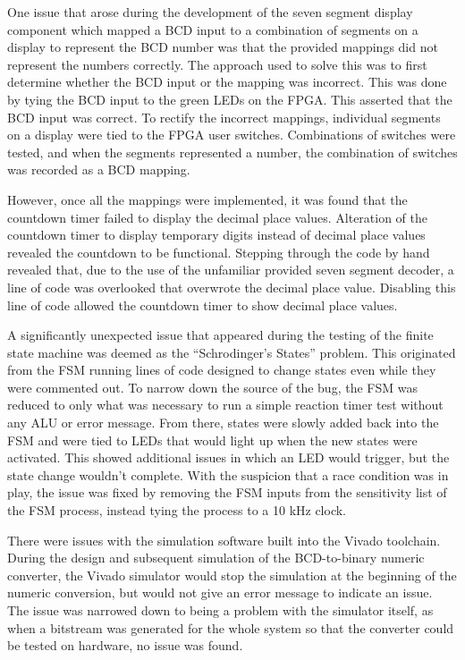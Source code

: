 \documentclass[11pt]{article}
\begin{document}
One issue that arose during the development of the seven segment display component which mapped a BCD input to a combination of segments on a display to represent the BCD number was that the provided mappings did not represent the numbers correctly. The approach used to solve this was to first determine whether the BCD input or the mapping was incorrect. This was done by tying the BCD input to the green LEDs on the FPGA. This asserted that the BCD input was correct. To rectify the incorrect mappings, individual segments on a display were tied to the FPGA user switches. Combinations of switches were tested, and when the segments represented a number, the combination of switches was recorded as a BCD mapping.

However, once all the mappings were implemented, it was found that the countdown timer failed to display the decimal place values. Alteration of the countdown timer to display temporary digits instead of decimal place values revealed the countdown to be functional. Stepping through the code by hand revealed that, due to the use of the unfamiliar provided seven segment decoder, a line of code was overlooked that overwrote the decimal place value. Disabling this line of code allowed the countdown timer to show decimal place values.

A significantly unexpected issue that appeared during the testing of the finite state machine was deemed as the ``Schrodinger's States'' problem. This originated from the FSM running lines of code designed to change states even while they were commented out. To narrow down the source of the bug, the FSM was reduced to only what was necessary to run a simple reaction timer test without any ALU or error message. From there, states were slowly added back into the FSM and were tied to LEDs that would light up when the new states were activated. This showed additional issues in which an LED would trigger, but the state change wouldn't complete. With the suspicion that a race condition was in play, the issue was fixed by removing the FSM inputs from the sensitivity list of the FSM process, instead tying the process to a 10 kHz clock.

There were issues with the simulation software built into the Vivado toolchain. During the design and subsequent simulation of the BCD-to-binary numeric converter, the Vivado simulator would stop the simulation at the beginning of the numeric conversion, but would not give an error message to indicate an issue. The issue was narrowed down to being a problem with the simulator itself, as when a bitstream was generated for the whole system so that the converter could be tested on hardware, no issue was found.
\end{document}

